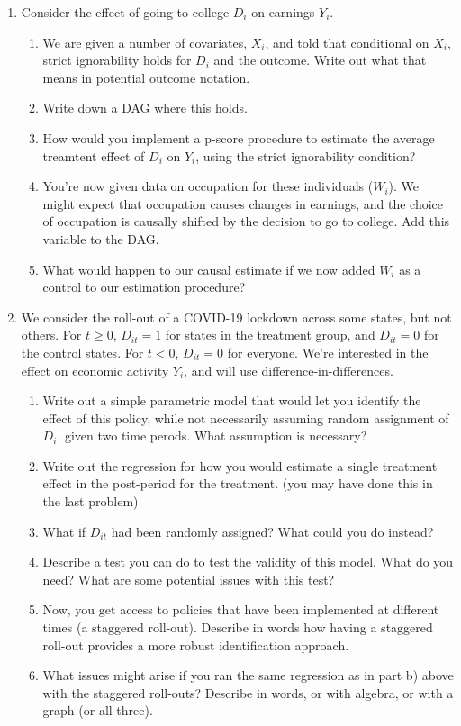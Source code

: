 \documentclass[11pt, a4paper]{article}
\begin{document}
\begin{enumerate}
\begin{enumerate}
    \end{enumerate}
  \item Consider the effect of going to college $D_{i}$ on earnings
    $Y_{i}$.
    \begin{enumerate}
    \item We are given a number of covariates, $X_{i}$, and told that
      conditional on $X_{i}$, strict ignorability holds for $D_{i}$
      and the outcome. Write out what that means in potential outcome notation.
    \item Write down a DAG where this holds.
    \item How would you implement a p-score procedure to estimate the
      average treamtent effect of $D_{i}$ on $Y_{i}$, using the strict
      ignorability condition?
    \item You're now given data on occupation for these individuals
      ($W_{i}$). We might expect that occupation causes changes in
      earnings, and the choice of occupation is causally shifted by
      the decision to go to college. Add this variable to the DAG.
    \item What would happen to our causal estimate if we now added
      $W_{i}$ as a control to our estimation procedure?
    \end{enumerate}
  \item We consider the roll-out of a COVID-19 lockdown across some
    states, but not others. For $t \geq 0$, $D_{it} = 1$ for states in
    the treatment group, and $D_{it} = 0$ for the control states. For
    $t < 0$, $D_{it} = 0$ for everyone. We're interested in the effect
    on economic activity $Y_{i}$, and will use difference-in-differences.
    \begin{enumerate}
    \item Write out a simple parametric model that would let you
      identify the effect of this policy, while not necessarily
      assuming random assignment of $D_{i}$, given two time
      perods. What assumption is necessary?
    \item Write out the regression for how you would estimate a single
      treatment effect in the post-period for the treatment. (you may have done this in the last problem)
    \item What if $D_{it}$ had been randomly assigned? What could you do instead?
    \item Describe a test you can do to test the validity of this
      model. What do you need? What are some potential issues with
      this test?
    \item Now, you get access to policies that have been implemented
      at different times (a staggered roll-out). Describe in words how
      having a staggered roll-out provides a more robust
      identification approach.
    \item What issues might arise if you ran the same regression as in
      part b) above with the staggered roll-outs?  Describe in words,
      or with algebra, or with a graph (or all three). 
    \end{enumerate}
\end{enumerate}
  
\end{document}
